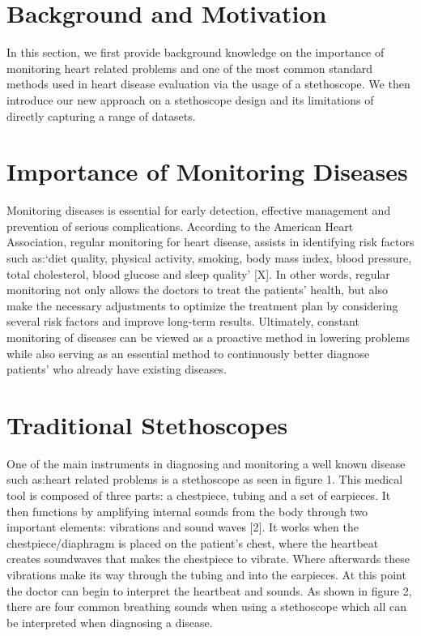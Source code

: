 \documentclass[twocolumn]{article}
\begin{document}
\section{Background and Motivation} 
In this section, we first provide background knowledge on the importance of monitoring heart related problems and one of the most common standard methods used in heart disease evaluation via the usage of a stethoscope. We then introduce our new approach on a stethoscope design and its limitations of directly capturing a range of datasets.


\section{Importance of Monitoring Diseases} 
Monitoring diseases is essential for early detection, effective management and prevention of serious complications. According to the American Heart Association, regular monitoring for heart disease, assists in identifying risk factors such as:‘diet quality, physical activity, smoking, body mass index, blood pressure, total cholesterol, blood glucose and sleep quality’ [X]. In other words, regular monitoring not only allows the doctors to treat the patients’ health, but also make the necessary adjustments to optimize the treatment plan by considering several risk factors and improve long-term results. Ultimately, constant monitoring of diseases  can be viewed as a proactive method in lowering problems while also serving as an essential method to continuously better diagnose patients' who already have existing diseases. 


\section{Traditional Stethoscopes} 
One of the main instruments in diagnosing and monitoring a well known disease such as:heart related problems is a stethoscope as seen in figure 1. This medical tool is composed of three parts: a chestpiece, tubing and a set of earpieces. It then functions by amplifying internal sounds from the body through two important elements: vibrations and sound waves [2]. It works when the chestpiece/diaphragm is placed on the patient’s chest, where the heartbeat creates soundwaves that makes the chestpiece to vibrate. Where afterwards these vibrations make its way through the tubing and into the earpieces. At this point the doctor can begin to interpret the heartbeat and sounds. As shown in figure 2, there are four common breathing sounds when using a stethoscope which all can be interpreted when diagnosing a disease.
\end{document}
